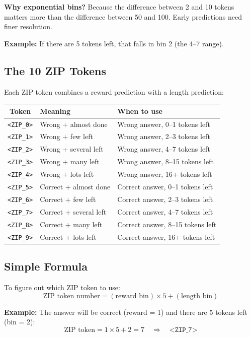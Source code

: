 \documentclass[11pt,a4paper]{article}
\newcommand{\ziptoken}[1]{\texttt{<ZIP\_#1>}}
\begin{document}
\textbf{Why exponential bins?} Because the difference between 2 and 10 tokens matters more than the difference between 50 and 100. Early predictions need finer resolution.

\textbf{Example:} If there are 5 tokens left, that falls in bin 2 (the 4--7 range).

\subsection{The 10 ZIP Tokens}

Each ZIP token combines a reward prediction with a length prediction:

\begin{center}
\begin{tabular}{@{}clp{6cm}@{}}
\toprule
\textbf{Token} & \textbf{Meaning} & \textbf{When to use} \\
\midrule
\ziptoken{0} & Wrong + almost done & Wrong answer, 0--1 tokens left \\
\ziptoken{1} & Wrong + few left & Wrong answer, 2--3 tokens left \\
\ziptoken{2} & Wrong + several left & Wrong answer, 4--7 tokens left \\
\ziptoken{3} & Wrong + many left & Wrong answer, 8--15 tokens left \\
\ziptoken{4} & Wrong + lots left & Wrong answer, 16+ tokens left \\
\ziptoken{5} & Correct + almost done & Correct answer, 0--1 tokens left \\
\ziptoken{6} & Correct + few left & Correct answer, 2--3 tokens left \\
\ziptoken{7} & Correct + several left & Correct answer, 4--7 tokens left \\
\ziptoken{8} & Correct + many left & Correct answer, 8--15 tokens left \\
\ziptoken{9} & Correct + lots left & Correct answer, 16+ tokens left \\
\bottomrule
\end{tabular}
\end{center}

\subsection{Simple Formula}

To figure out which ZIP token to use:
\[
\text{ZIP token number} = (\text{reward bin}) \times 5 + (\text{length bin})
\]

\textbf{Example:} The answer will be correct (reward = 1) and there are 5 tokens left (bin = 2):
\[
\text{ZIP token} = 1 \times 5 + 2 = 7 \quad \Rightarrow \quad \ziptoken{7}
\]
\end{document}
